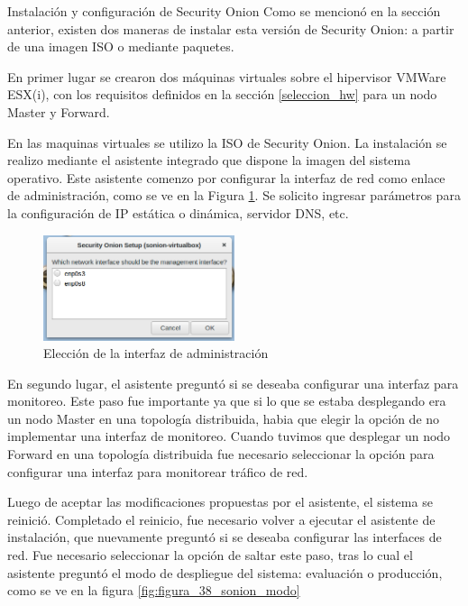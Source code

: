         \begin{section}{Instalación y configuración de Security Onion}
        Como se mencionó en la sección anterior, existen dos maneras de instalar esta versión de Security Onion: a partir de una imagen ISO o mediante paquetes. \par 
        En primer lugar se crearon dos máquinas virtuales sobre el hipervisor VMWare ESX(i), con los requisitos definidos en la sección \ref{seleccion_hw} para un nodo Master y Forward.\par
        En las maquinas virtuales se utilizo la ISO de Security Onion. La instalación se realizo mediante el asistente integrado que dispone la imagen del sistema operativo. Este asistente comenzo por configurar la interfaz de red como enlace de administración, como se ve en la Figura \ref{fig:figura_37_sonion_conf}. Se solicito ingresar parámetros para la configuración de IP estática o dinámica, servidor DNS, etc. \par
        \begin{figure}[H]
            \centering
            \includegraphics[width=0.5\textwidth]{./iteracion_1_imagenes/figura_37_sonion_conf.png}
            \caption{Elección de la interfaz de administración}
            \label{fig:figura_37_sonion_conf}
        \end{figure}
        \FloatBarrier
        En segundo lugar, el asistente preguntó si se deseaba configurar una interfaz para monitoreo. Este paso fue importante ya que si lo que se estaba desplegando era un nodo Master en una topología distribuida, habia que elegir la opción de no implementar una interfaz de monitoreo. Cuando tuvimos que desplegar un nodo Forward en una topología distribuida fue necesario seleccionar la opción para configurar una interfaz para monitorear tráfico de red. \par
        Luego de aceptar las modificaciones propuestas por el asistente, el sistema se reinició. Completado el reinicio, fue necesario volver a ejecutar el asistente de instalación, que nuevamente preguntó si se deseaba configurar las interfaces de red. Fue necesario seleccionar la opción de saltar este paso, tras lo cual el asistente preguntó el modo de despliegue del sistema: evaluación o producción, como se ve en la figura \ref{fig:figura_38_sonion_modo}

\end{section}
